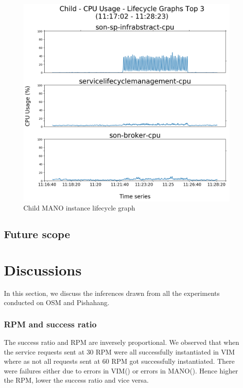 \begin{figure}
	\centering
	\includegraphics[width=0.65\linewidth]{figures/scalability_graphs/Scalability-Evaluation/Child-TOP-3-Lifecycle}
	\caption{Child MANO instance lifecycle graph}
	\label{fig:child-top-3-lifecycle}
\end{figure}



\subsection{Future scope}

\pagebreak

\section{Discussions}

In this section, we discuss the inferences drawn from all the experiments conducted on OSM and Pishahang.

\subsubsection{RPM and success ratio}
The success ratio and RPM are inversely proportional. We observed that when the service requests sent at 30 RPM were all successfully  instantiated in VIM where as not all requests sent at 60 RPM got successfully instantiated. There were failures either due to errors in VIM() or errors in MANO(). Hence higher the RPM, lower the success ratio and vice versa. 
